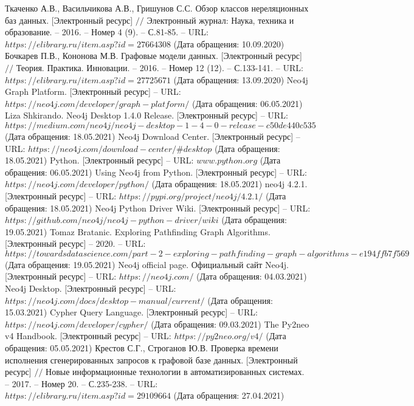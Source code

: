 \begin{thebibliography}{00}
	Ткаченко А.В., Васильчикова А.В., Гришунов С.С. Обзор классов нереляционных баз данных. [Электронный ресурс] $//$ Электронный журнал: Наука, техника и образование. -- 2016. -- Номер 4 (9). -- С.81-85. -- URL: $https://elibrary.ru/item.asp?id=27664308$ (Дата обращения: 10.09.2020)
	Бочкарев П.В., Кононова М.В. Графовые модели данных. [Электронный ресурс] $//$ Теория. Практика. Инновации. -- 2016. -- Номер 12 (12). -- С.133-141. -- URL: $https://elibrary.ru/item.asp?id=27725671$ (Дата обращения: 13.09.2020)
	Neo4j Graph Platform. [Электронный ресурс] -- URL: $https://neo4j.com/developer/graph-platform/$ (Дата обращения: 06.05.2021)
	Liza Shkirando. Neo4j Desktop 1.4.0 Release. [Электронный ресурс] -- URL: $https://medium.com/neo4j/neo4j-desktop-1-4-0-release-c50de440c535$ (Дата обращения: 18.05.2021)
	Neo4j Download Center. [Электронный ресурс] -- URL: $https://neo4j.com/download-center/\#desktop$ (Дата обращения: 18.05.2021)
	Python. [Электронный ресурс] -- URL: $www.python.org$ (Дата обращения: 06.05.2021)
	Using Neo4j from Python. [Электронный ресурс] -- URL: $https://neo4j.com/developer/python/$ (Дата обращения: 18.05.2021)
	neo4j 4.2.1. [Электронный ресурс] -- URL: $https://pypi.org/project/neo4j/4.2.1/$ (Дата обращения: 18.05.2021)
	Neo4j Python Driver Wiki. [Электронный ресурс] -- URL: $https://github.com/neo4j/neo4j-python-driver/wiki$ (Дата обращения: 19.05.2021)
	Tomaz Bratanic. Exploring Pathfinding Graph Algorithms. [Электронный ресурс] -- 2020. -- URL: $https://towardsdatascience.com/part-2-exploring-pathfinding-graph-algorithms-e194ffb7f569$ (Дата обращения: 19.05.2021)
	Neo4j official page. Официальный сайт Neo4j. [Электронный ресурс] -- URL: $https://neo4j.com/$ (Дата обращения: 04.03.2021)
	Neo4j Desktop. [Электронный ресурс] -- URL: $https://neo4j.com/docs/desktop-manual/current/$ (Дата обращения: 15.03.2021)
	Cypher Query Language. [Электронный ресурс] -- URL: $https://neo4j.com/developer/cypher/$ (Дата обращения: 09.03.2021)
	The Py2neo v4 Handbook. [Электронный ресурс] -- URL: $https://py2neo.org/v4/$ (Дата обращения: 05.05.2021)
	Крестов С.Г., Строганов Ю.В. Проверка времени исполнения сгенерированных запросов к графовой базе данных. [Электронный ресурс] $//$ Новые информационные технологии в автоматизированных системах. -- 2017. -- Номер 20. -- С.235-238. -- URL: $https://elibrary.ru/item.asp?id=29109664$ (Дата обращения: 27.04.2021)

\end{thebibliography}
